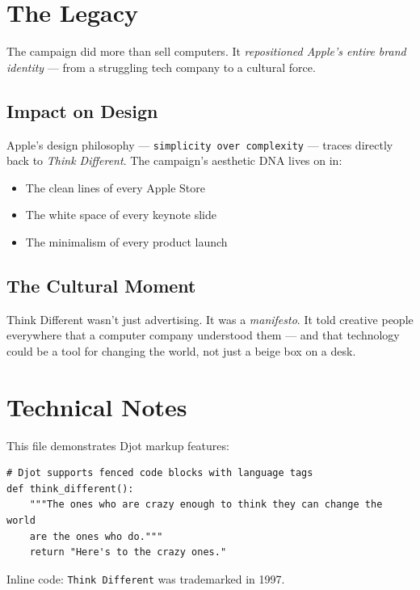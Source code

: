 \documentclass[11pt,a4paper]{article}
\begin{document}
\section{The Legacy}

The campaign did more than sell computers. It \emph{repositioned Apple's entire brand identity} --- from a struggling tech company to a cultural force.

\subsection{Impact on Design}

Apple's design philosophy --- \texttt{simplicity over complexity} --- traces directly back to \emph{Think Different}. The campaign's aesthetic DNA lives on in:

\begin{itemize}
  \item The clean lines of every Apple Store
  \item The white space of every keynote slide
  \item The minimalism of every product launch
\end{itemize}

\subsection{The Cultural Moment}

\begin{notebox}
Think Different wasn't just advertising. It was a \emph{manifesto}. It told creative people everywhere that a computer company understood them --- and that technology could be a tool for changing the world, not just a beige box on a desk.
\end{notebox}

\section{Technical Notes}

This file demonstrates Djot markup features:

\begin{lstlisting}
# Djot supports fenced code blocks with language tags
def think_different():
    """The ones who are crazy enough to think they can change the world
    are the ones who do."""
    return "Here's to the crazy ones."
\end{lstlisting}

Inline code: \texttt{Think Different} was trademarked in 1997.
\end{document}
